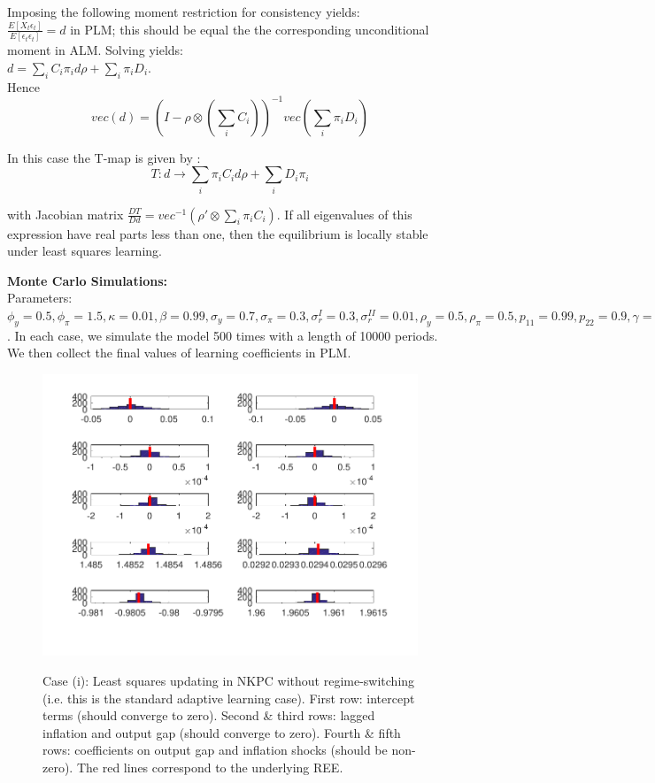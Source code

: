 \documentclass[12pt,reqno]{article}
\numberwithin{equation}{section}
\begin{document}
Imposing the following moment restriction for consistency yields: \\

$ \frac{ E[X_t \epsilon_t]}{E[\epsilon_t \epsilon_t]}= d  $  in PLM; this should be equal the the corresponding unconditional moment in ALM. Solving yields: \\

$ d = \sum_i C_i \pi_i d \rho + \sum_i \pi_i D_i $. \\

Hence 
$$ vec(d) = (I-\rho \otimes (\sum_i C_i))^{-1} vec(\sum_i \pi_i D_i ) $$

In this case the T-map is given by : \\

$$ T : d \rightarrow \sum_i \pi_i C_i d \rho + \sum_i D_i \pi_i $$

with Jacobian matrix  $ \frac{DT }{D d} = vec^{-1}(\rho' \otimes \sum_i \pi_i C_i) $. If all eigenvalues of this expression have real parts less than one, then the equilibrium is locally stable under least squares learning. 

\newpage 

\textbf{Monte Carlo Simulations: } \\

Parameters: $\phi_y =0.5, \phi_{\pi}=1.5, \kappa=0.01, \beta=0.99, \sigma_y = 0.7, \sigma_{\pi} =0.3, \sigma^{I}_r =0.3, \sigma^{II}_r=0.01,\rho_y =0.5, \rho_{\pi}=0.5 , p_{11} = 0.99, p_{22} = 0.9, \gamma = 0.01$. In each case, we simulate the model 500 times with a length of 10000 periods. We then collect the final values of learning coefficients in PLM. \\


\begin{figure}[H]
\caption{Case (i): Least squares updating in NKPC without regime-switching (i.e. this is the standard adaptive learning case). First row: intercept terms (should converge to zero). Second \& third rows: lagged inflation and output gap (should converge to zero). Fourth \& fifth rows: coefficients on output gap and inflation shocks (should be non-zero). The red lines correspond to the underlying REE.  }

\includegraphics[scale=1.2]{MC_MSV_withoutLags.pdf}\\
\end{figure}
\end{document}
